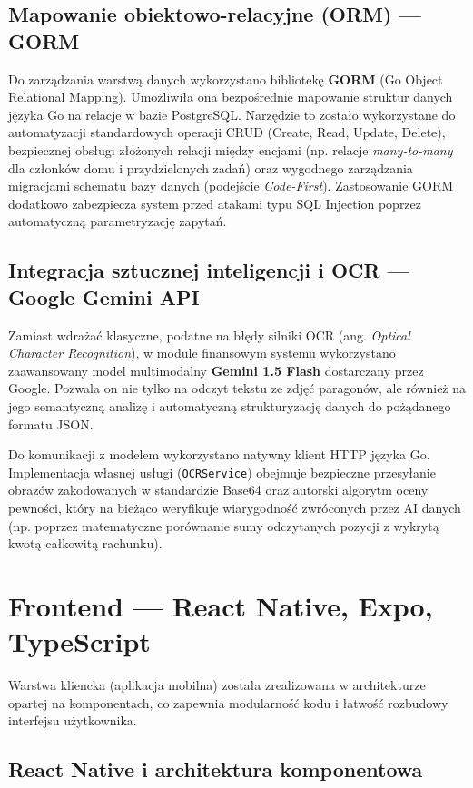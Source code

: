 \subsection{Mapowanie obiektowo-relacyjne (ORM) --- GORM}

Do zarządzania warstwą danych wykorzystano bibliotekę \textbf{GORM} (Go Object Relational Mapping). Umożliwiła ona bezpośrednie mapowanie struktur danych języka Go na relacje w bazie PostgreSQL. Narzędzie to zostało wykorzystane do automatyzacji standardowych operacji CRUD (Create, Read, Update, Delete), bezpiecznej obsługi złożonych relacji między encjami (np. relacje \textit{many-to-many} dla członków domu i przydzielonych zadań) oraz wygodnego zarządzania migracjami schematu bazy danych (podejście \textit{Code-First}). Zastosowanie GORM dodatkowo zabezpiecza system przed atakami typu SQL Injection poprzez automatyczną parametryzację zapytań.

\subsection{Integracja sztucznej inteligencji i OCR --- Google Gemini API}

Zamiast wdrażać klasyczne, podatne na błędy silniki OCR (ang. \textit{Optical Character Recognition}), w module finansowym systemu wykorzystano zaawansowany model multimodalny \textbf{Gemini 1.5 Flash} dostarczany przez Google. Pozwala on nie tylko na odczyt tekstu ze zdjęć paragonów, ale również na jego semantyczną analizę i automatyczną strukturyzację danych do pożądanego formatu JSON. 

Do komunikacji z modelem wykorzystano natywny klient HTTP języka Go. Implementacja własnej usługi (\texttt{OCRService}) obejmuje bezpieczne przesyłanie obrazów zakodowanych w standardzie Base64 oraz autorski algorytm oceny pewności, który na bieżąco weryfikuje wiarygodność zwróconych przez AI danych (np. poprzez matematyczne porównanie sumy odczytanych pozycji z wykrytą kwotą całkowitą rachunku).
\section{Frontend --- React Native, Expo, TypeScript}

Warstwa kliencka (aplikacja mobilna) została zrealizowana w architekturze opartej na komponentach, co zapewnia modularność kodu i łatwość rozbudowy interfejsu użytkownika.

\subsection{React Native i architektura komponentowa}

